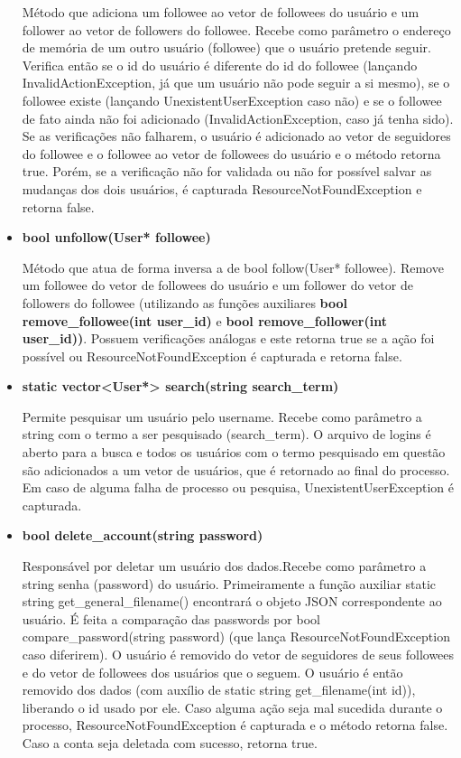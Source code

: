 \documentclass[a4paper]{article}
\begin{document}
\begin{itemize}
    Método que adiciona um followee ao vetor de followees do usuário e um follower ao vetor de followers do followee. Recebe como parâmetro o endereço de memória de um outro usuário (followee) que o usuário pretende seguir. Verifica então se o id do usuário é diferente do id do followee (lançando InvalidActionException, já que um usuário não pode seguir a si mesmo), se o followee existe (lançando UnexistentUserException caso não) e se o followee de fato ainda não foi adicionado (InvalidActionException, caso já tenha sido). Se as verificações não falharem, o usuário é adicionado ao vetor de seguidores do followee e o followee ao vetor de followees do usuário e o método retorna true. Porém, se a verificação não for validada ou não for possível salvar as mudanças dos dois usuários, é capturada ResourceNotFoundException e retorna false.

    \item \textbf{bool unfollow(User* followee)}

    Método que atua de forma inversa a de bool follow(User* followee). Remove um followee do vetor de followees do usuário e um follower do vetor de followers do followee (utilizando as funções auxiliares \textbf{bool remove\_followee(int user\_id)} e \textbf{bool remove\_follower(int user\_id))}. Possuem verificações análogas e este retorna true se a ação foi possível ou ResourceNotFoundException é capturada e retorna false.

    \item \textbf{static vector<User*> search(string search\_term)}

    Permite pesquisar um usuário pelo username. Recebe como parâmetro a string com o termo a ser pesquisado (search\_term). O arquivo de logins é aberto para a busca e todos os usuários com o termo pesquisado em questão são adicionados a um vetor de usuários, que é retornado ao final do processo. Em caso de alguma falha de processo ou pesquisa, UnexistentUserException é capturada.

    \item \textbf{bool delete\_account(string password)}

    Responsável por deletar um usuário dos dados.Recebe como parâmetro a string senha (password) do usuário. Primeiramente a função auxiliar static string get\_general\_filename() encontrará o objeto JSON correspondente ao usuário. É feita a comparação das passwords por bool compare\_password(string password) (que lança ResourceNotFoundException caso diferirem). O usuário é removido do vetor de seguidores de seus followees e do vetor de followees dos usuários que o seguem. O usuário é então removido dos dados (com auxílio de static string get\_filename(int id)), liberando o id usado por ele. Caso alguma ação seja mal sucedida durante o processo, ResourceNotFoundException é capturada e o método retorna false. Caso a conta seja deletada com sucesso, retorna true.



\end{itemize}
\end{document}
